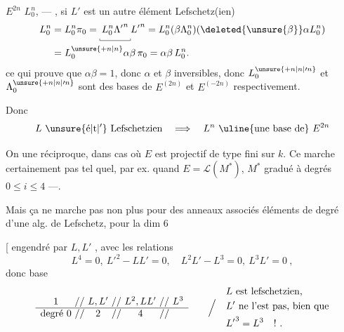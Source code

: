 $E^{2n}$  $L_0^n$,    --- , si $L'$ est un autre élément Lefschetz(ien)
\[
\begin{aligned}
L_0^n&=L_0^n\pi_0=\underset{\rule{.35pt}{.5ex}\rule{3.1em}{.35pt}\rule{.35pt}{.5ex}}{L_0^n{\Lambda'}^{n}}{L'}^{n}
=L_0^n(\beta\Lambda_0^n)(\deleted{\unsure{\beta}}\alpha L_0^n)\\
&=L_0^{\unsure{+n|n}}\alpha\beta\,\pi_0=\alpha\beta\, L_0^n.
\end{aligned}
\]
ce qui prouve que $\alpha\beta=1$, donc $\alpha$ et $\beta$ inversibles, donc  $L_0^{\unsure{+n|n|\prime n}}$ et $\Lambda_0^{\unsure{+n|n|\prime n}}$ sont des bases de $E^{(2n)}$ et $E^{(-2n)}$ respectivement.

Donc
\[
L\ \unsure{\text{é}|\text{t}|{}^{\prime}}\ \text{Lefschetzien}\quad\Longrightarrow\quad L^n\ \text{\uline{une base de}}\ E^{2n}
\]

 On   une réciproque, dans   cas où  $E$ est projectif de type fini sur $k$. Ce  marche certainement pas tel quel, par ex. quand $E=\mathcal L(M^*)$, $M^*$ gradué à degrés $0\leq i\leq4$ ---.

Mais ça ne marche pas non plus pour des anneaux associés  éléments de degré  d'une alg. de Lefschetz, pour la dim 6

[ engendré par $L,L'$ , avec les relations
\[
L^4=0,\ {L'}^{2}-LL'=0,\quad L^2L'-L^3=0,\ L^3L'=0\ ,
\]
donc base
\[
\begin{array}{c@{\ //\ }c@{\ //\ }c@{\ //\ }c}
1&L,L'&L^2,LL'&L^3\\ \hline
\text{degré }0&2&4&
\end{array}
\qquad\Big/\quad
\begin{aligned}
&L\ \text{est lefschetzien,}\\
&L'\ \text{ne l'est pas, bien que}\\
&{L'}^{3}=L^3\quad !\ .
\end{aligned}
\]
